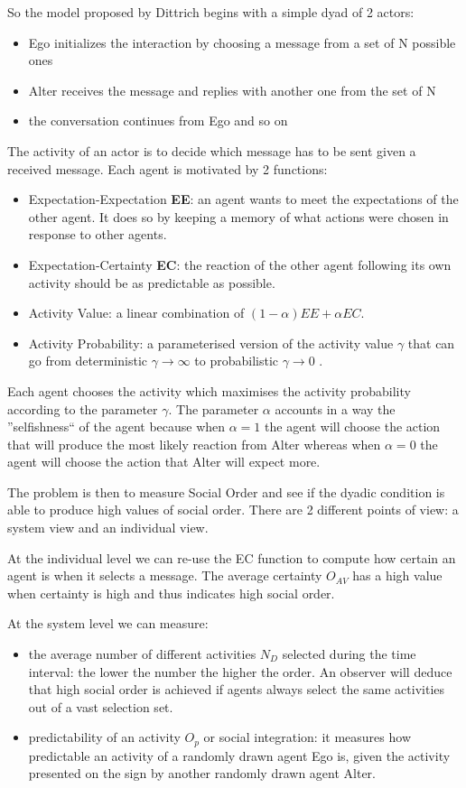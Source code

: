 So the model proposed by Dittrich begins with a simple dyad of 2 actors:
\begin{itemize}
 \item Ego initializes the interaction by choosing a message from a set of N possible ones
 \item Alter receives the message and replies with another one from the set of N
 \item the conversation continues from Ego and so on
\end{itemize}
The activity of an actor is to decide which message has to be sent given a received message.
Each agent is motivated by 2 functions:
\begin{itemize}
 \item Expectation-Expectation \textbf{EE}: an agent wants to meet the
expectations of the other agent. It does so by keeping a memory of what actions
were chosen in response to other agents.
 \item Expectation-Certainty \textbf{EC}:  the reaction of the other agent
following its own activity should be as predictable as possible.
 \item Activity Value: a linear combination of $(1 - \alpha)EE + \alpha EC$.
 \item Activity Probability: a parameterised version of the activity
value $\gamma$ that can go from deterministic $\gamma \rightarrow \infty$
to probabilistic $\gamma \rightarrow 0$ .
\end{itemize}

Each agent chooses the activity which maximises the activity probability according
 to the parameter $\gamma$.
The parameter $\alpha$ accounts in a way the ''selfishness`` of the agent because
when $\alpha=1$ the agent will choose the action that will produce the most likely
reaction from Alter whereas when $\alpha=0$ the agent will choose the action
that Alter will expect more.

The problem is then to measure Social Order and see if the dyadic condition is
able to produce high values of social order. There are 2 different points
of view: a system view and an individual view.

At the individual level we can re-use the EC function to compute how certain
an agent is when it selects a message.
The average certainty $O_{AV}$ has a high value when certainty is high and thus
indicates high social order.

At the system level we can measure:
\begin{itemize}
 \item the average number of different activities $N_D$ selected during the
time interval: the lower the number the higher the order. An observer will
deduce that high social order is achieved if agents always select the same
activities out of a vast selection set.
 \item predictability of an activity $O_p$ or social integration: it measures
how predictable an activity of a randomly drawn agent Ego is, given the
activity presented on the sign by another randomly drawn agent Alter.
\end{itemize}

